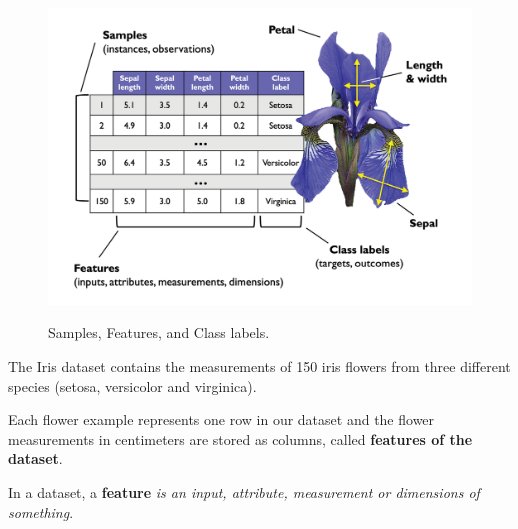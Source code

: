 \documentclass[../machine_learning_scikit.tex]{subfiles}
\begin{document}
    \begin{figure}[h]
        \begin{minipage}{\textwidth}
            \centering
            \includegraphics[scale=1]{images/definitions.png} \\
            \caption{Samples, Features, and Class labels.}
            \label{figure:samples_features_class_labels}
        \end{minipage}
    \end{figure}

    \begin{exa}
        The Iris dataset contains the measurements of 150 iris flowers from three different species (setosa, versicolor and virginica).
    \end{exa}
    
    Each flower example represents one row in our dataset and the flower measurements in centimeters are stored as columns, called \textbf{features of the dataset}.

    \begin{mydef}
        In a dataset, a \textbf{feature} \textit{is an input, attribute, measurement or dimensions of something}.
    \end{mydef}
\end{document}
